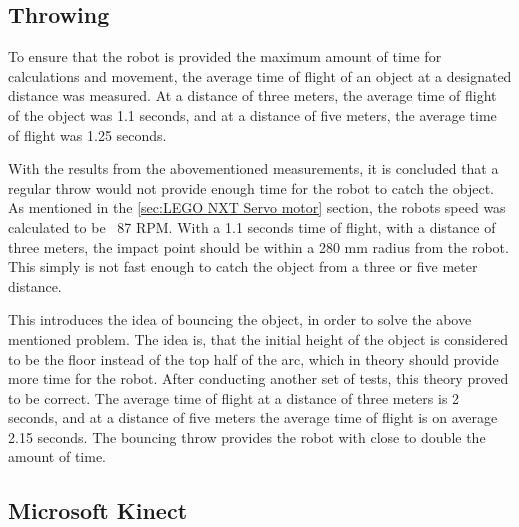 \subsection{Throwing}
\label{sec:i1ThrowingImplementation} 
To ensure that the robot is provided the maximum amount of time for calculations and movement, the average time of flight of an object at a designated distance was measured. At a distance of three meters, the average time of flight of the object was 1.1 seconds, and at a distance of five meters, the average time of flight was 1.25 seconds.

With the results from the abovementioned measurements, it is concluded that a regular throw would not provide enough time for the robot to catch the object. As mentioned in the \ref{sec:LEGO NXT Servo motor} section, the robots speed was calculated to be ~87 RPM. With a 1.1 seconds time of flight, with a distance of three meters, the impact point should be within a 280 mm radius from the robot. This simply is not fast enough to catch the object from a three or five meter distance.

This introduces the idea of bouncing the object, in order to solve the above mentioned problem. The idea is, that the initial height of the object is considered to be the floor instead of the top half of the arc, which in theory should provide more time for the robot. \newline
After conducting another set of tests, this theory proved to be correct. The average time of flight at a distance of three meters is 2 seconds, and at a distance of five meters the average time of flight is on average 2.15 seconds. The bouncing throw provides the robot with close to double the amount of time.

\subsection{Microsoft Kinect}
\label{sec:i1Microsoft KinectImplementation}

